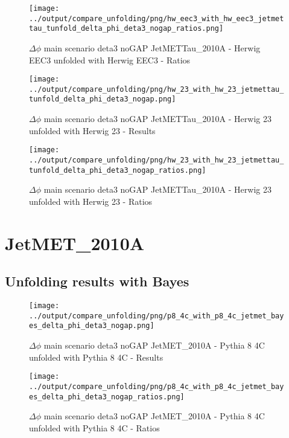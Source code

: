 \documentclass[11pt]{book}
\begin{document}
\begin{figure}[ht]
\centering
\texttt{[image: ../output/compare\_unfolding/png/hw\_eec3\_with\_hw\_eec3\_jetmettau\_tunfold\_delta\_phi\_deta3\_nogap\_ratios.png]}
\caption{$\Delta\phi$ main scenario deta3 noGAP JetMETTau\_2010A - Herwig EEC3 unfolded with Herwig EEC3 - Ratios}
\label{hw_eec3_hw_eec3_jetmettau_tunfold_delta_phi_deta3_nogap_b}
\end{figure}

\begin{figure}[ht]
\centering
\texttt{[image: ../output/compare\_unfolding/png/hw\_23\_with\_hw\_23\_jetmettau\_tunfold\_delta\_phi\_deta3\_nogap.png]}
\caption{$\Delta\phi$ main scenario deta3 noGAP JetMETTau\_2010A - Herwig 23 unfolded with Herwig 23 - Results}
\label{hw_23_hw_23_jetmettau_tunfold_delta_phi_deta3_nogap_a}
\end{figure}

\begin{figure}[ht]
\centering
\texttt{[image: ../output/compare\_unfolding/png/hw\_23\_with\_hw\_23\_jetmettau\_tunfold\_delta\_phi\_deta3\_nogap\_ratios.png]}
\caption{$\Delta\phi$ main scenario deta3 noGAP JetMETTau\_2010A - Herwig 23 unfolded with Herwig 23 - Ratios}
\label{hw_23_hw_23_jetmettau_tunfold_delta_phi_deta3_nogap_b}
\end{figure}


\clearpage
\section{JetMET\_2010A}
\subsection{Unfolding results with Bayes}

\begin{figure}[ht]
\centering
\texttt{[image: ../output/compare\_unfolding/png/p8\_4c\_with\_p8\_4c\_jetmet\_bayes\_delta\_phi\_deta3\_nogap.png]}
\caption{$\Delta\phi$ main scenario deta3 noGAP JetMET\_2010A - Pythia 8 4C unfolded with Pythia 8 4C - Results}
\label{p8_p8_jetmet_bayes_delta_phi_deta3_nogap_a}
\end{figure}

\begin{figure}[ht]
\centering
\texttt{[image: ../output/compare\_unfolding/png/p8\_4c\_with\_p8\_4c\_jetmet\_bayes\_delta\_phi\_deta3\_nogap\_ratios.png]}
\caption{$\Delta\phi$ main scenario deta3 noGAP JetMET\_2010A - Pythia 8 4C unfolded with Pythia 8 4C - Ratios}
\label{p8_p8_jetmet_bayes_delta_phi_deta3_nogap_b}
\end{figure}
\end{document}
